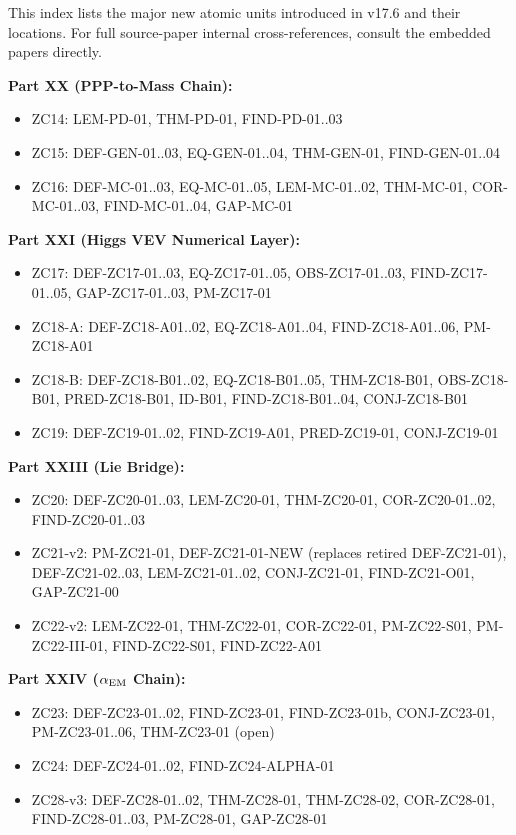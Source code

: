 \documentclass[12pt, a4paper]{article}
\begin{document}
This index lists the major new atomic units introduced in v17.6
and their locations. For full source-paper internal cross-references,
consult the embedded papers directly.

\textbf{Part XX (PPP-to-Mass Chain):}
\begin{itemize}[leftmargin=*, noitemsep]
\item ZC14: LEM-PD-01, THM-PD-01, FIND-PD-01..03
\item ZC15: DEF-GEN-01..03, EQ-GEN-01..04, THM-GEN-01, FIND-GEN-01..04
\item ZC16: DEF-MC-01..03, EQ-MC-01..05, LEM-MC-01..02, THM-MC-01,
  COR-MC-01..03, FIND-MC-01..04, GAP-MC-01
\end{itemize}

\textbf{Part XXI (Higgs VEV Numerical Layer):}
\begin{itemize}[leftmargin=*, noitemsep]
\item ZC17: DEF-ZC17-01..03, EQ-ZC17-01..05, OBS-ZC17-01..03,
  FIND-ZC17-01..05, GAP-ZC17-01..03, PM-ZC17-01
\item ZC18-A: DEF-ZC18-A01..02, EQ-ZC18-A01..04, FIND-ZC18-A01..06, PM-ZC18-A01
\item ZC18-B: DEF-ZC18-B01..02, EQ-ZC18-B01..05, THM-ZC18-B01, OBS-ZC18-B01,
  PRED-ZC18-B01, ID-B01, FIND-ZC18-B01..04, CONJ-ZC18-B01
\item ZC19: DEF-ZC19-01..02, FIND-ZC19-A01, PRED-ZC19-01, CONJ-ZC19-01
\end{itemize}

\textbf{Part XXIII (Lie Bridge):}
\begin{itemize}[leftmargin=*, noitemsep]
\item ZC20: DEF-ZC20-01..03, LEM-ZC20-01, THM-ZC20-01, COR-ZC20-01..02,
  FIND-ZC20-01..03
\item ZC21-v2: PM-ZC21-01, DEF-ZC21-01-NEW (replaces retired DEF-ZC21-01),
  DEF-ZC21-02..03, LEM-ZC21-01..02, CONJ-ZC21-01, FIND-ZC21-O01, GAP-ZC21-00
\item ZC22-v2: LEM-ZC22-01, THM-ZC22-01, COR-ZC22-01, PM-ZC22-S01,
  PM-ZC22-III-01, FIND-ZC22-S01, FIND-ZC22-A01
\end{itemize}

\textbf{Part XXIV ($\alpha_{\rm EM}$ Chain):}
\begin{itemize}[leftmargin=*, noitemsep]
\item ZC23: DEF-ZC23-01..02, FIND-ZC23-01, FIND-ZC23-01b, CONJ-ZC23-01,
  PM-ZC23-01..06, THM-ZC23-01 (open)
\item ZC24: DEF-ZC24-01..02, FIND-ZC24-ALPHA-01
\item ZC28-v3: DEF-ZC28-01..02, THM-ZC28-01, THM-ZC28-02, COR-ZC28-01,
  FIND-ZC28-01..03, PM-ZC28-01, GAP-ZC28-01
\end{itemize}
\end{document}
